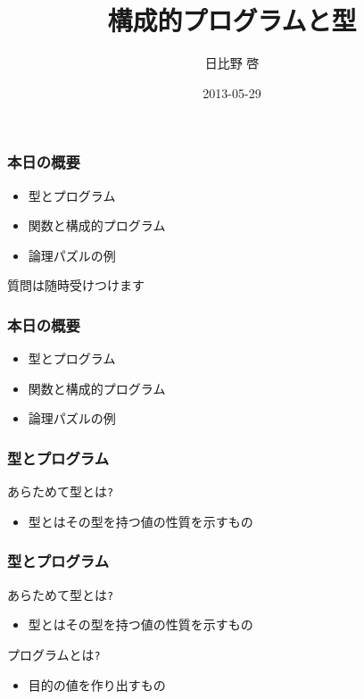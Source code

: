 \documentclass[cjk,dvipdfm,14pt]{beamer}
\title{構成的プログラムと型}
\author{日比野 啓}
\date{2013-05-29}
\begin{document}
\begin{frame}
\maketitle
\end{frame}

\begin{frame}[fragile]
\frametitle{本日の概要}

\begin{itemize}
\item 型とプログラム
\item 関数と構成的プログラム
\item 論理パズルの例
\end{itemize}

\end{frame}

\begin{frame}[fragile]
質問は随時受けつけます
\end{frame}

\begin{frame}[fragile]
\frametitle{本日の概要}

\begin{itemize}
\item { \color{red} 型とプログラム }
\item 関数と構成的プログラム
\item 論理パズルの例
\end{itemize}

\end{frame}

\begin{frame}[fragile]
\frametitle{型とプログラム}
あらためて型とは\verb|?|
\begin{itemize}
\item { \color{red} 型とはその型を持つ値の性質を示すもの }
\end{itemize}
\end{frame}

\begin{frame}[fragile]
\frametitle{型とプログラム}

あらためて型とは\verb|?|
\begin{itemize}
\item 型とはその型を持つ値の性質を示すもの
\end{itemize}

プログラムとは\verb|?|
\begin{itemize}
\item { \color{red} 目的の値を作り出すもの }
\end{itemize}

\end{frame}
\end{document}
